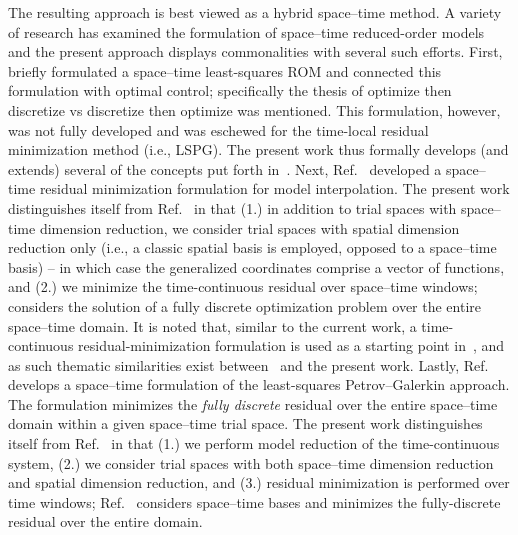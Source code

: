 \documentclass[3p,computermodern,10pt]{elsarticle}
\begin{document}
The resulting approach is best viewed as a hybrid space--time method. A
variety of research has examined the formulation of space--time reduced-order
models~\cite{choi_stlspg,constantine_strom,URBAN2012203,Yano2014ASC,bui_thesis}
and the present approach displays commonalities with several such efforts.
First,~\cite{bui_thesis} briefly formulated a space--time least-squares ROM
and connected this formulation with optimal control; specifically the thesis
of optimize then discretize vs discretize then optimize was mentioned. This
formulation, however, was not fully developed and was eschewed for the
time-local residual minimization method (i.e., LSPG). The present work thus
formally develops (and extends) several of the concepts put forth
in~\cite{bui_thesis}. Next, Ref.~\cite{constantine_strom} developed a
space--time residual minimization formulation for model interpolation.  The
present work distinguishes itself from Ref.~\cite{constantine_strom} in that
(1.) in addition to trial spaces with space--time dimension reduction, we
consider trial spaces with spatial dimension reduction only (i.e., a classic
spatial basis is employed, opposed to a space--time basis) -- in which case
the generalized coordinates comprise a vector of functions, and (2.) we
minimize the time-continuous residual over space--time
windows;~\cite{constantine_strom} considers the solution of a fully discrete
optimization problem over the entire space--time domain. It is noted that,
similar to the current work, a time-continuous residual-minimization
formulation is used as a starting point in~\cite{constantine_strom}, and as
such thematic similarities exist between~\cite{constantine_strom} and the
present work. Lastly, Ref.~\cite{choi_stlspg} develops a space--time
formulation of the least-squares Petrov--Galerkin approach. The formulation
minimizes the \textit{fully discrete} residual over the entire space--time
domain within a given space--time trial space. 
The present work distinguishes itself from Ref.~\cite{choi_stlspg} in that
(1.) we perform model reduction of the time-continuous system, (2.) we
consider trial spaces with both space--time dimension reduction and spatial
dimension reduction, and (3.) residual minimization is performed over time
windows; Ref.~\cite{choi_stlspg} considers space--time bases and minimizes the
fully-discrete residual over the entire domain. 
\end{document}
